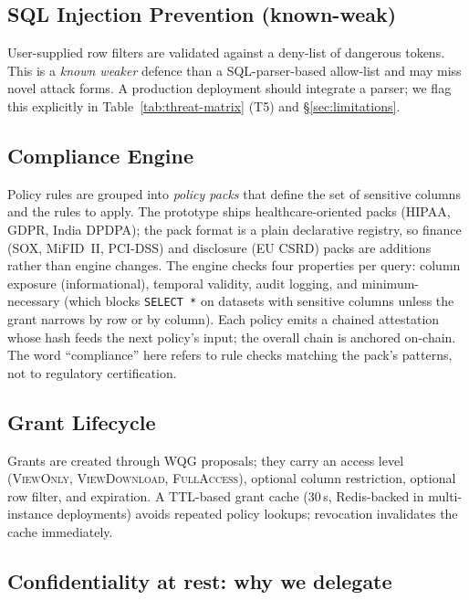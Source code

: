 \documentclass[10pt,twocolumn]{article}
\begin{document}
\subsection{SQL Injection Prevention (known-weak)}

User-supplied row filters are validated against a deny-list of
dangerous tokens. This is a \emph{known weaker} defence than a
SQL-parser-based allow-list and may miss novel attack forms. A
production deployment should integrate a parser; we flag this
explicitly in Table~\ref{tab:threat-matrix} (T5) and
\S\ref{sec:limitations}.

\subsection{Compliance Engine}

Policy rules are grouped into \emph{policy packs} that define the
set of sensitive columns and the rules to apply. The prototype
ships healthcare-oriented packs (HIPAA, GDPR, India DPDPA); the
pack format is a plain declarative registry, so finance
(SOX, MiFID~II, PCI-DSS) and disclosure (EU CSRD) packs are
additions rather than engine changes. The engine checks four
properties per query: column exposure (informational), temporal
validity, audit logging, and minimum-necessary (which blocks
\texttt{SELECT~*} on datasets with sensitive columns unless the
grant narrows by row or by column). Each policy emits a chained
attestation whose hash feeds the next policy's input; the overall
chain is anchored on-chain. The word ``compliance'' here refers
to rule checks matching the pack's patterns, not to regulatory
certification.

\subsection{Grant Lifecycle}

Grants are created through WQG proposals; they carry an access
level (\textsc{ViewOnly}, \textsc{ViewDownload}, \textsc{FullAccess}),
optional column restriction, optional row filter, and expiration.
A TTL-based grant cache (30\,s, Redis-backed in multi-instance
deployments) avoids repeated policy lookups; revocation invalidates
the cache immediately.

\subsection{Confidentiality at rest: why we delegate}
\label{sec:rest-split}
\end{document}
